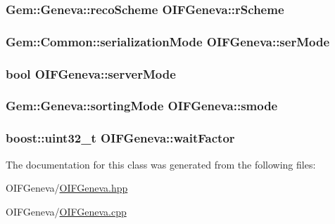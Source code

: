 \label{d4/dce/classOIFGeneva_a812f07c15fdfda372b6fb82ad9d3795a}
\hypertarget{classOIFGeneva_a84d9c1da4a30943abe44cbc58162755f}{
\subsubsection[{rScheme}]{\setlength{\rightskip}{0pt plus 5cm}Gem::Geneva::recoScheme {\bf OIFGeneva::rScheme}}}
\label{d4/dce/classOIFGeneva_a84d9c1da4a30943abe44cbc58162755f}
\hypertarget{classOIFGeneva_aaad7df3d69cbe6399123820e7fef2a3c}{
\subsubsection[{serMode}]{\setlength{\rightskip}{0pt plus 5cm}Gem::Common::serializationMode {\bf OIFGeneva::serMode}}}
\label{d4/dce/classOIFGeneva_aaad7df3d69cbe6399123820e7fef2a3c}
\hypertarget{classOIFGeneva_a12fed8d5df83853111e8e9bba2b00b5e}{
\subsubsection[{serverMode}]{\setlength{\rightskip}{0pt plus 5cm}bool {\bf OIFGeneva::serverMode}}}
\label{d4/dce/classOIFGeneva_a12fed8d5df83853111e8e9bba2b00b5e}
\hypertarget{classOIFGeneva_a74949f91a856d291c760b6668ace8275}{
\subsubsection[{smode}]{\setlength{\rightskip}{0pt plus 5cm}Gem::Geneva::sortingMode {\bf OIFGeneva::smode}}}
\label{d4/dce/classOIFGeneva_a74949f91a856d291c760b6668ace8275}
\hypertarget{classOIFGeneva_ad40b4a27317aacf88a920b07c23010ab}{
\subsubsection[{waitFactor}]{\setlength{\rightskip}{0pt plus 5cm}boost::uint32\_\-t {\bf OIFGeneva::waitFactor}}}
\label{d4/dce/classOIFGeneva_ad40b4a27317aacf88a920b07c23010ab}


The documentation for this class was generated from the following files:\begin{DoxyCompactItemize}
\item 
OIFGeneva/\hyperlink{OIFGeneva_8hpp}{OIFGeneva.hpp}\item 
OIFGeneva/\hyperlink{OIFGeneva_8cpp}{OIFGeneva.cpp}\end{DoxyCompactItemize}
